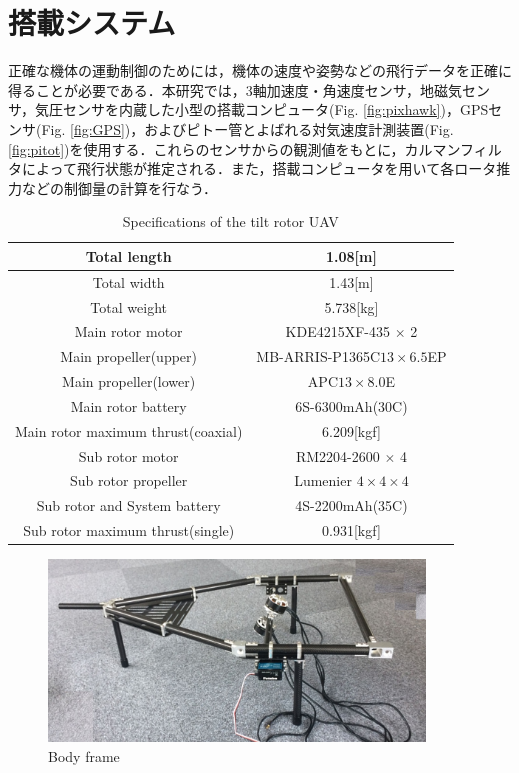 \section{搭載システム}

正確な機体の運動制御のためには，機体の速度や姿勢などの飛行データを正確に得ることが必要である．本研究では，3軸加速度・角速度センサ，地磁気センサ，気圧センサを内蔵した小型の搭載コンピュータ(Fig. \ref{fig:pixhawk})，GPSセンサ(Fig. \ref{fig:GPS})，およびピトー管とよばれる対気速度計測装置(Fig. \ref{fig:pitot})を使用する．これらのセンサからの観測値をもとに，カルマンフィルタによって飛行状態が推定される．また，搭載コンピュータを用いて各ロータ推力などの制御量の計算を行なう．
\begin{table}[htb]
	\begin{center}
		\caption{Specifications of the tilt rotor UAV}
		\label{spec}
		\begin{tabular}{|c|c|}\hline
			Total length & 1.08[m] \\ \hline
			Total width & 1.43[m] \\ \hline
			Total weight & 5.738[kg]\\ \hline
			Main rotor motor & KDE4215XF-435 $\times$ 2\\ \hline
			Main propeller(upper) & MB-ARRIS-P1365C$13 \times 6.5$EP\\ \hline
			Main propeller(lower) & APC$13 \times 8.0$E\\ \hline
			Main rotor battery & 6S-6300mAh(30C)\\ \hline
			Main rotor maximum thrust(coaxial) & 6.209[kgf]\\ \hline
			Sub rotor motor & RM2204-2600 $\times$ 4\\ \hline
			Sub rotor propeller & Lumenier $4 \times 4 \times 4$\\ \hline
			Sub rotor and System battery & 4S-2200mAh(35C)\\ \hline
			Sub rotor maximum thrust(single) & 0.931[kgf]\\ \hline
		\end{tabular}
	\end{center}
\end{table}
\begin{figure}[hb]
	\begin{center}
		\includegraphics[clip,width=10.0cm,bb=0 0 1122 543]{./z_figure_files/chapter2/9_frame.jpeg}
		\caption{Body frame}
		\label{fig:frame}
	\end{center}
\end{figure}

